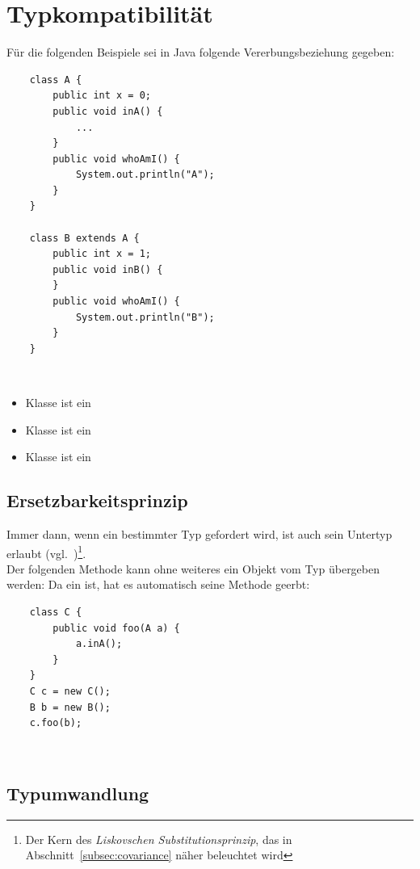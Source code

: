 \section{Typkompatibilität}\label{sec:typecompatibility}


Für die folgenden Beispiele sei in Java folgende Vererbungsbeziehung gegeben:

\begin{verbatim}
    class A {
        public int x = 0;
        public void inA() {
            ...
        }
        public void whoAmI() {
            System.out.println("A");
        }
    }

    class B extends A {
        public int x = 1;
        public void inB() {
        }
        public void whoAmI() {
            System.out.println("B");
        }
    }
\end{verbatim}\\

\begin{itemize}
    \item Klasse  ist ein 
    \item Klasse  ist ein 
    \item Klasse  ist ein 
\end{itemize}

\subsection{Ersetzbarkeitsprinzip}

Immer dann, wenn ein bestimmter Typ gefordert wird, ist auch sein Untertyp erlaubt (vgl.~\cite[466]{Ull23})\footnote{
Der Kern des \textit{Liskovschen Substitutionsprinzip}, das in Abschnitt~\ref{subsec:covariance} näher beleuchtet wird
}.\\

\noindent
Der folgenden Methode kann ohne weiteres ein Objekt vom Typ  übergeben werden: Da  ein  ist,
hat es automatisch seine Methode  geerbt:

\begin{verbatim}
    class C {
        public void foo(A a) {
            a.inA();
        }
    }
    C c = new C();
    B b = new B();
    c.foo(b);
\end{verbatim}\\

\subsection{Typumwandlung}

